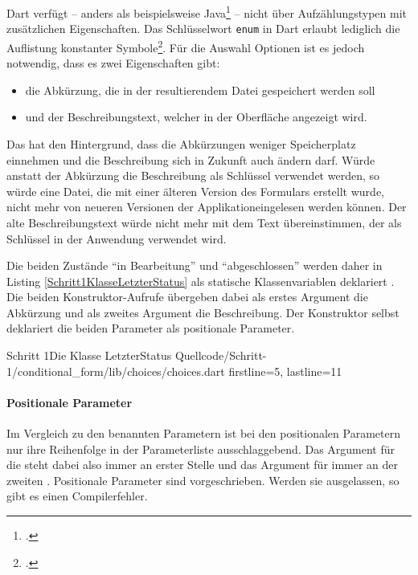 Dart verfügt – anders als beispielsweise Java\footcite[Vgl.][S. 321]{TheJavaLanguageSpecificationJavaSE16Edition} – nicht über Aufzählungstypen mit zusätzlichen Eigenschaften. Das Schlüsselwort \texttt{enum} in Dart erlaubt lediglich die Auflistung konstanter Symbole\footcite[Vgl.][S. 74f.]{DartProgrammingLanguageSpecification5thedition}. Für die Auswahl Optionen ist es jedoch notwendig, dass es zwei Eigenschaften gibt:
\begin{itemize}
  \parsep 0pt
  \topsep 0pt
  \itemsep 0pt

  \item die Abkürzung, die in der resultierendem Datei gespeichert werden soll
  \item und der Beschreibungstext, welcher in der Oberfläche angezeigt wird.
\end{itemize}
Das hat den Hintergrund, dass die Abkürzungen weniger Speicherplatz einnehmen und die Beschreibung sich in Zukunft auch ändern darf. Würde anstatt der Abkürzung die Beschreibung als Schlüssel verwendet werden, so würde eine Datei, die mit einer älteren Version des Formulars erstellt wurde, nicht mehr von neueren Versionen der Applikationeingelesen werden können. Der alte Beschreibungstext würde nicht mehr mit dem Text übereinstimmen, der als Schlüssel in der Anwendung verwendet wird.


Die beiden Zustände \enquote{in Bearbeitung} und \enquote{abgeschlossen} werden daher in Listing \ref{Schritt1KlasseLetzterStatus} als statische Klassenvariablen deklariert . Die beiden Konstruktor-Aufrufe übergeben dabei als erstes Argument die Abkürzung und als zweites Argument die Beschreibung. Der Konstruktor selbst  deklariert die beiden Parameter als positionale Parameter.

\begin{alexlisting}{Schritt 1}{Die Klasse LetzterStatus}
  {Quellcode/Schritt-1/conditional_form/lib/choices/choices.dart}
  {firstline=5, lastline=11}
  \label{lst:Schritt1KlasseLetzterStatus}
\end{alexlisting}

\paragraph{Positionale Parameter}

Im Vergleich zu den benannten Parametern ist bei den positionalen Parametern nur ihre Reihenfolge in der Parameterliste ausschlaggebend. Das Argument für die  steht dabei also immer an erster Stelle und das Argument für  immer an der zweiten . Positionale Parameter sind vorgeschrieben. Werden sie ausgelassen, so gibt es einen Compilerfehler. 

